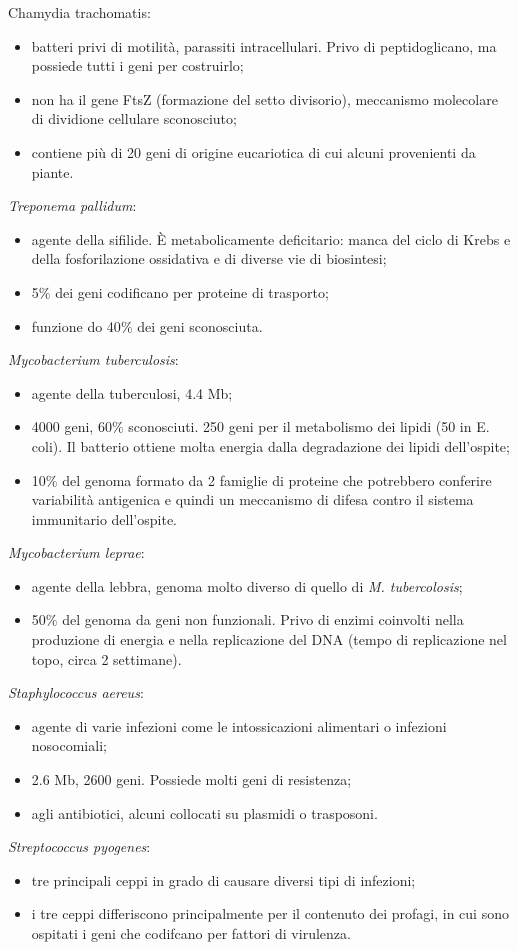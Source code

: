 \textit{}{Chamydia trachomatis}:
\begin{itemize}
    \item batteri privi di motilit\`a, parassiti intracellulari. Privo di peptidoglicano, ma possiede tutti i geni per costruirlo;
    \item non ha il gene FtsZ (formazione del setto divisorio), meccanismo molecolare di dividione cellulare sconosciuto;
    \item contiene pi\`u di 20 geni di origine eucariotica di cui alcuni provenienti da piante.
\end{itemize}
\textit{Treponema pallidum}:
\begin{itemize}
    \item agente della sifilide. \`E metabolicamente deficitario: manca del ciclo di Krebs e della fosforilazione ossidativa e di diverse vie di biosintesi; 
    \item 5$\%$ dei geni codificano per proteine di trasporto; 
    \item funzione do 40$\%$ dei geni sconosciuta. 
\end{itemize}
\textit{Mycobacterium tuberculosis}:
\begin{itemize}
    \item agente della tuberculosi, 4.4 Mb; 
    \item 4000 geni, 60$\%$ sconosciuti. 250 geni per il metabolismo dei lipidi (50 in E. coli). Il batterio ottiene molta energia dalla degradazione dei lipidi dell'ospite; 
    \item 10$\%$ del genoma formato da 2 famiglie di proteine che potrebbero conferire variabilit\`a antigenica e quindi un meccanismo di difesa contro il sistema immunitario dell'ospite.
\end{itemize}
\textit{Mycobacterium leprae}:
\begin{itemize}
    \item agente della lebbra, genoma molto diverso di quello di \textit{M. tubercolosis};
    \item 50$\%$ del genoma da geni non funzionali. Privo di enzimi coinvolti nella produzione di energia e nella replicazione del DNA (tempo di replicazione nel topo, circa 2 settimane).
\end{itemize}
\textit{Staphylococcus aereus}:
\begin{itemize}
    \item agente di varie infezioni come le intossicazioni alimentari o infezioni nosocomiali; 
    \item 2.6 Mb, 2600 geni. Possiede molti geni di resistenza; 
    \item agli antibiotici, alcuni collocati su plasmidi o trasposoni.
\end{itemize}
\textit{Streptococcus pyogenes}:
\begin{itemize}
    \item tre principali ceppi in grado di causare diversi tipi di infezioni; 
    \item i tre ceppi differiscono principalmente per il contenuto dei profagi, in cui sono ospitati i geni che codifcano per fattori di virulenza.
\end{itemize}
